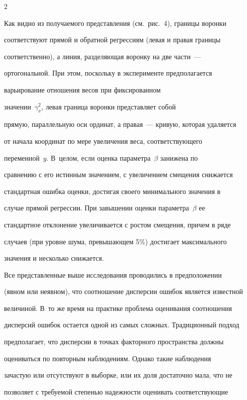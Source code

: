\begin{multicols}{2}
\begin{figure}
  \end{figure}



  Как видно из получаемого представления (см.\ рис.~4), границы воронки

соответствуют прямой и обратной регрессиям (левая и правая границы

соответственно), а линия, разделяющая воронку на две части~---

ортогональной. При этом, поскольку в эксперименте предполагается

варьирование отношения весов при фиксированном

значении~$\gamma^2_x$, левая граница воронки представляет собой

прямую, параллельную оси ординат, а правая~--- кривую, которая удаляется

от начала координат по мере увеличения веса, соответствующего

переменной~$y$. В~целом, если оценка параметра~$\beta$ занижена по

сравнению с его истинным значением, с увеличением смещения снижается

стандартная ошибка оценки, достигая своего минимального значения в

случае прямой регрессии. При завышении оценки параметра~$\beta$ ее

стандартное отклонение увеличивается с ростом смещения, причем в ряде

случаев (при уровне шума, превышающем 5\%) достигает максимального

значения и несколько снижается.



  Все представленные выше исследования проводились в предположении

(явном или неявном), что соотношение дисперсии ошибок является известной

величиной. В~то же время на практике проблема оценивания соотношения

дисперсий ошибок остается одной из самых сложных. Традиционный подход

предполагает, что дисперсии в точках факторного пространства должны

оцениваться по повторным наблюдениям. Однако такие наблюдения

зачастую или отсутствуют в выборке, или их доля достаточно мала, что не

позволяет с требуемой степенью надежности оценивать соответствующие


\end{multicols}
